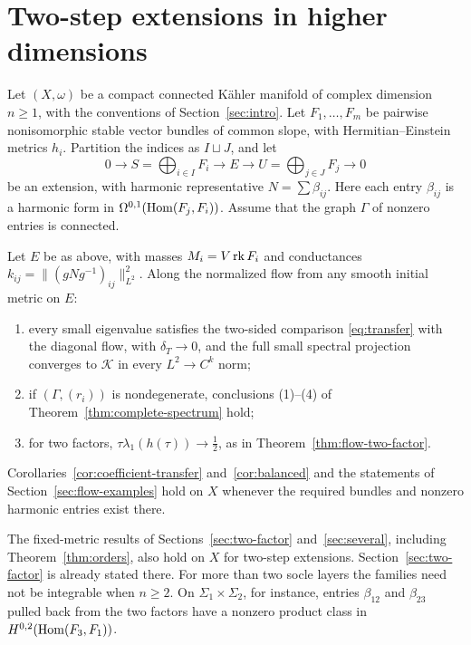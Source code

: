 \section{Two-step extensions in higher dimensions}\label{sec:higher-dim}

Let $(X,\omega)$ be a compact connected K\"ahler manifold of complex
dimension $n\ge1$, with the conventions of Section~\ref{sec:intro}. Let
$F_1,\ldots,F_m$ be pairwise nonisomorphic stable vector bundles of common
slope, with Hermitian--Einstein metrics $h_i$. Partition the indices as
$I\sqcup J$, and let
\[
 0\longrightarrow S=\bigoplus_{i\in I}F_i\longrightarrow E\longrightarrow
 U=\bigoplus_{j\in J}F_j\longrightarrow0
\]
be an extension, with harmonic representative $N=\sum\beta_{ij}$. Here each
entry $\beta_{ij}$ is a harmonic form in $\Omega^{0,1}(\operatorname{Hom}(F_j,F_i))$.
Assume that the graph $\Gamma$ of nonzero entries is connected.

\begin{theorem}\label{thm:higher-dim}
Let $E$ be as above, with masses $M_i=V\operatorname{rk} F_i$ and conductances
$k_{ij}=\lVert(gNg^{-1})_{ij}\rVert_{L^2}^2$. Along the normalized flow from
any smooth initial metric on $E$:
\begin{enumerate}
\item every small eigenvalue satisfies the two-sided comparison
 \eqref{eq:transfer} with the diagonal flow, with $\delta_T\to0$, and the
 full small spectral projection converges to $\mathcal K$ in every
 $L^2\to C^k$ norm;
\item if $(\Gamma,(r_i))$ is nondegenerate, conclusions (1)--(4) of
 Theorem~\ref{thm:complete-spectrum} hold;
\item for two factors, $\tau\lambda_1(h(\tau))\to\frac12$, as in
 Theorem~\ref{thm:flow-two-factor}.
\end{enumerate}
Corollaries~\ref{cor:coefficient-transfer} and~\ref{cor:balanced} and the
statements of Section~\ref{sec:flow-examples} hold on $X$ whenever the
required bundles and nonzero harmonic entries exist there.
\end{theorem}

The fixed-metric results of Sections~\ref{sec:two-factor}
and~\ref{sec:several}, including Theorem~\ref{thm:orders}, also hold on $X$
for two-step extensions. Section~\ref{sec:two-factor} is already stated
there. For more than two socle layers the families need not be integrable
when $n\ge2$. On
$\Sigma_1\times\Sigma_2$, for instance, entries $\beta_{12}$ and $\beta_{23}$ pulled
back from the two factors have a nonzero product class in
$H^{0,2}(\operatorname{Hom}(F_3,F_1))$.

